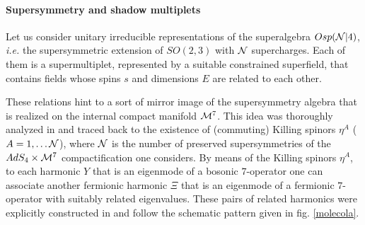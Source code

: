 \documentclass[a4paper,11pt]{article}
\begin{document}
\paragraph{Supersymmetry and shadow multiplets}
Let us consider unitary irreducible representations of the
superalgebra $Osp({\cal N}\vert 4)$, {\it i.e.} the supersymmetric
extension of $SO(2,3)$ with ${\cal N}$ supercharges. Each of them
is a  supermultiplet, represented by a suitable constrained
superfield, that contains fields whose spins $s$ and dimensions
$E$ are related to each other.
\par
These relations hint to a sort of mirror image of the
supersymmetry algebra that is realized on the internal compact
manifold ${\cal M}^7$. This idea was thoroughly analyzed in
\cite{univer} and traced back to the existence of (commuting)
Killing spinors $\eta^A$ ($A=1,\ldots {\cal N}$), where ${\cal N}$
is the number of preserved supersymmetries of the $AdS_4 \times
{\cal M}^7$ compactification one considers. By means of the
Killing spinors $\eta^A$, to each harmonic $Y$ that is an
eigenmode of a bosonic $7$-operator one can associate another
fermionic harmonic $\Xi$ that is an eigenmode of a fermionic
$7$-operator with suitably related eigenvalues. These pairs of
related harmonics were explicitly constructed in \cite{univer} and
follow the schematic pattern given in fig. \ref{molecola}.
\end{document}
